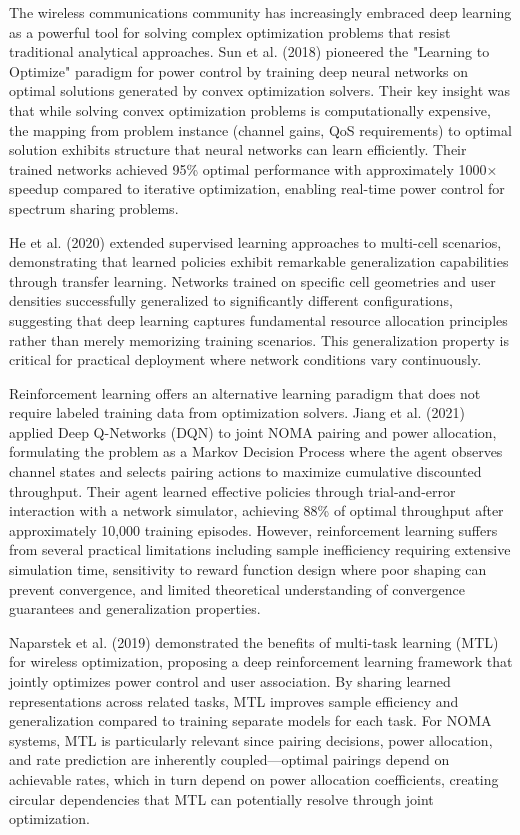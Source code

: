 The wireless communications community has increasingly embraced deep learning as a powerful tool for solving complex optimization problems that resist traditional analytical approaches. Sun et al. (2018) pioneered the "Learning to Optimize" paradigm for power control by training deep neural networks on optimal solutions generated by convex optimization solvers. Their key insight was that while solving convex optimization problems is computationally expensive, the mapping from problem instance (channel gains, QoS requirements) to optimal solution exhibits structure that neural networks can learn efficiently. Their trained networks achieved 95\% optimal performance with approximately 1000× speedup compared to iterative optimization, enabling real-time power control for spectrum sharing problems.

He et al. (2020) extended supervised learning approaches to multi-cell scenarios, demonstrating that learned policies exhibit remarkable generalization capabilities through transfer learning. Networks trained on specific cell geometries and user densities successfully generalized to significantly different configurations, suggesting that deep learning captures fundamental resource allocation principles rather than merely memorizing training scenarios. This generalization property is critical for practical deployment where network conditions vary continuously.

Reinforcement learning offers an alternative learning paradigm that does not require labeled training data from optimization solvers. Jiang et al. (2021) applied Deep Q-Networks (DQN) to joint NOMA pairing and power allocation, formulating the problem as a Markov Decision Process where the agent observes channel states and selects pairing actions to maximize cumulative discounted throughput. Their agent learned effective policies through trial-and-error interaction with a network simulator, achieving 88\% of optimal throughput after approximately 10,000 training episodes. However, reinforcement learning suffers from several practical limitations including sample inefficiency requiring extensive simulation time, sensitivity to reward function design where poor shaping can prevent convergence, and limited theoretical understanding of convergence guarantees and generalization properties.

Naparstek et al. (2019) demonstrated the benefits of multi-task learning (MTL) for wireless optimization, proposing a deep reinforcement learning framework that jointly optimizes power control and user association. By sharing learned representations across related tasks, MTL improves sample efficiency and generalization compared to training separate models for each task. For NOMA systems, MTL is particularly relevant since pairing decisions, power allocation, and rate prediction are inherently coupled—optimal pairings depend on achievable rates, which in turn depend on power allocation coefficients, creating circular dependencies that MTL can potentially resolve through joint optimization.

